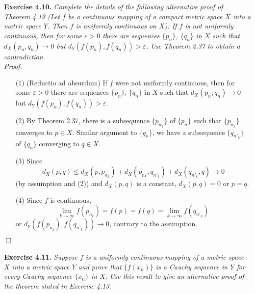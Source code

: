 \documentclass{article}
\begin{document}



\textbf{Exercise 4.10.}
\emph{Complete the details of the following alternative proof of Theorem 4.19
(Let $f$ be a continuous mapping of a compact metric space $X$ into a metric space $Y$.
Then $f$ is uniformly continuous on $X$):
If $f$ is not uniformly continuous,
then for some $\varepsilon > 0$
there are sequences $\{p_n\}$, $\{q_n\}$ in $X$ such that
$d_X(p_n,q_n) \to 0$ but $d_Y(f(p_n),f(q_n)) > \varepsilon$.
Use Theorem 2.37 to obtain a contradiction.} \\

\emph{Proof.}
\begin{enumerate}
\item[(1)]
(Reductio ad absurdum)
If $f$ were not uniformly continuous,
then for some $\varepsilon > 0$
there are sequences $\{p_n\}$, $\{q_n\}$ in $X$ such that
$d_X(p_n,q_n) \to 0$ but $d_Y(f(p_n),f(q_n)) > \varepsilon$.

\item[(2)]
By Theorem 2.37,
there is a subsequence $\{p_{n_k}\}$ of $\{p_n\}$ such that
$\{p_{n_k}\}$ converges to $p \in X$.
Similar argument to $\{q_n\}$,
we have a subsequence $\{q_{n'_k}\}$ of $\{q_n\}$ converging to $q \in X$.

\item[(3)]
Since
\[
  d_X(p,q)
  \leq d_X(p,p_{n_k}) + d_X(p_{n_k},q_{n'_k}) + d_X(q_{n'_k},q)
  \to 0
\]
(by assumption and (2)) and $d_X(p,q)$ is a constant,
$d_X(p,q) = 0$ or $p = q$.

\item[(4)]
Since $f$ is continuous,
\[
  \lim_{k \to \infty} f(p_{n_k})
  = f(p)
  = f(q)
  = \lim_{k \to \infty} f(q_{n'_k})
\]
or $d_Y(f(p_{n_k}),f(q_{n'_k})) \to 0$,
contrary to the assumption.
\end{enumerate}
$\Box$ \\\\






\textbf{Exercise 4.11.}
\emph{Suppose $f$ is a uniformly continuous mapping of a metric space $X$ into a metric space $Y$
and prove that $\{f(x_n)\}$ is a Cauchy sequence in $Y$ for every Cauchy sequence $\{x_n\}$ in $X$.
Use this result to give an alternative proof of the theorem stated in Exercise 4.13.} \\
\end{document}
